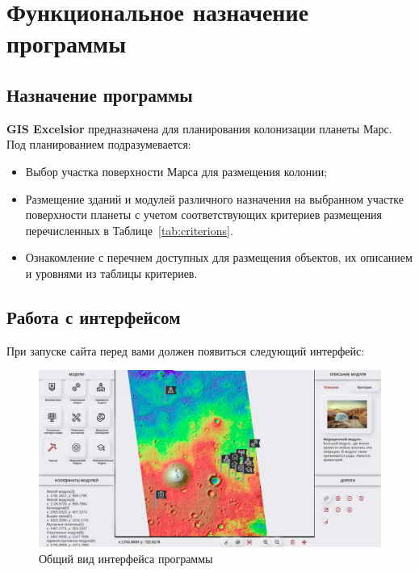
\section{Функциональное назначение программы}

\subsection{Назначение программы}

%
\textbf{GIS Excelsior} предназначена для планирования колонизации планеты Марс. Под планированием подразумевается:

\begin{itemize}
	\item Выбор участка поверхности Марса для размещения колонии;
	\item Размещение зданий и модулей различного назначения на выбранном участке поверхности планеты с учетом соответствующих критериев размещения перечисленных в Таблице~\ref{tab:criterions}.
	\item Ознакомление с перечнем доступных для размещения объектов, их описанием и уровнями из таблицы критериев.
\end{itemize}
%



\subsection{Работа с интерфейсом}

%
При запуске сайта перед вами должен появиться следующий интерфейс:

\begin{figure}[h!]
	\centering
	\includegraphics[width=.9\linewidth]{./img/interface}
	\caption{Общий вид интерфейса программы}\label{fig:interface}
\end{figure}


